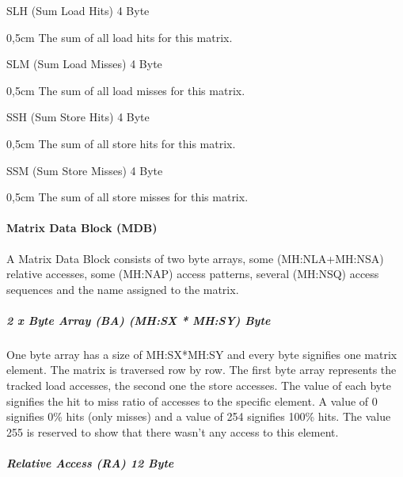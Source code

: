 SLH (Sum Load Hits) 4 Byte
\begin{addmargin}[0,5cm]{0,5cm} 
	The sum of all load hits for this matrix.
\end{addmargin}
SLM (Sum Load Misses) 4 Byte
\begin{addmargin}[0,5cm]{0,5cm} 
	The sum of all load misses for this matrix.
\end{addmargin}
SSH (Sum Store Hits) 4 Byte
\begin{addmargin}[0,5cm]{0,5cm} 
	The sum of all store hits for this matrix.
\end{addmargin}
SSM (Sum Store Misses) 4 Byte
\begin{addmargin}[0,5cm]{0,5cm}
	The sum of all store misses for this matrix.
\end{addmargin}

\paragraph{Matrix Data Block (MDB)}$\;$ \\

A Matrix Data Block consists of two byte arrays, some (MH:NLA+MH:NSA) relative accesses, some (MH:NAP) access 
patterns, several (MH:NSQ) access sequences and the name assigned to the matrix.

\subparagraph{2 x Byte Array (BA) (MH:SX * MH:SY) Byte}$\;$ \\

One byte array has a size of MH:SX*MH:SY and every byte signifies one matrix element. The matrix is traversed 
row by row. The first byte array represents the tracked load accesses, the second one the store accesses. 
The value of each byte signifies the hit to miss ratio of accesses to the specific element. 
A value of 0 signifies 0\% hits (only misses) and a value of 254 signifies 100\% hits. 
The value 255 is reserved to show that there wasn't any access to this element.

\subparagraph{Relative Access (RA) 12 Byte}$\;$ \\

